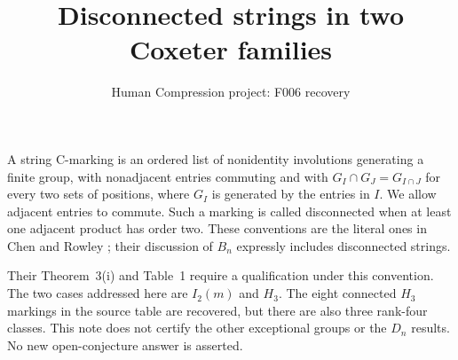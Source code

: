 \documentclass[11pt,a4paper]{article}
\title{Disconnected strings in two Coxeter families}
\author{Human Compression project: F006 recovery}
\date{}
\begin{document}
\maketitle
A string C-marking is an ordered list of nonidentity involutions generating a
finite group, with nonadjacent entries commuting and with
$G_I\cap G_J=G_{I\cap J}$ for every two sets of positions, where $G_I$
is generated by the entries in $I$. We allow adjacent entries to commute.
Such a marking is called disconnected when at least one adjacent product has
order two. These conventions are the literal ones in Chen and Rowley
\cite{source}; their discussion of $B_n$ expressly includes disconnected strings.

Their Theorem~3(i) and Table~1 require a qualification under this convention.
The two cases addressed here are $I_2(m)$ and $H_3$. The eight connected
$H_3$ markings in the source table are recovered, but there are also three
rank-four classes. This note does not certify the other exceptional groups or
the $D_n$ results. No new open-conjecture answer is asserted.
\end{document}
